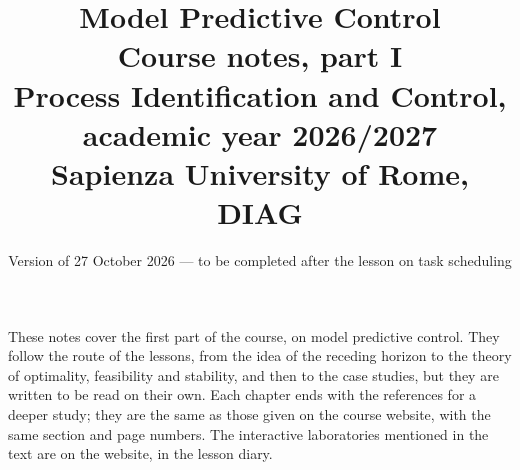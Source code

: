 \documentclass[11pt,a4paper]{article}
\title{\vspace{-8mm}\textbf{Model Predictive Control}\\[2mm]
  \large Course notes, part I\\[3mm]
  \normalsize Process Identification and Control, academic year 2026/2027\\
  Sapienza University of Rome, DIAG}
\author{}
\date{\small Version of 27 October 2026 --- to be completed after the lesson on task scheduling}
\theoremstyle{definition}
\theoremstyle{plain}
\theoremstyle{remark}
\begin{document}
\maketitle

\begin{center}
\begin{minipage}{0.9\textwidth}\small
These notes cover the first part of the course, on model predictive control. They follow the
route of the lessons, from the idea of the receding horizon to the theory of optimality,
feasibility and stability, and then to the case studies, but they are written to be read on their
own. Each chapter ends with the references for a deeper study; they are the same as those given
on the course website, with the same section and page numbers. The interactive laboratories
mentioned in the text are on the website, in the lesson diary.
\end{minipage}
\end{center}

\tableofcontents
\clearpage










\end{document}
